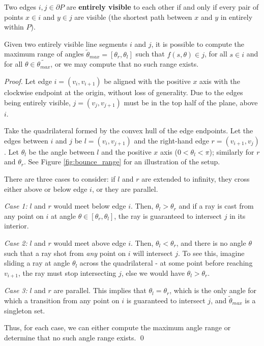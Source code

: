\documentclass[]{styles/svproc}  %
\begin{document}
\begin{definition}
Two edges $i,j \in \partial P$ are \textbf{entirely visible} to each other if
and only if every pair of points $x \in i$ and $y \in j$ are visible (the
shortest path between $x$ and $y$ in entirely within $P$).
\end{definition}

\begin{proposition}
Given two entirely visible line segments $i$ and $j$, it is possible to compute
the maximum range of angles $\tilde{\theta}_{max} = [\theta_r, \theta_l]$ such
that $f(s, \theta) \in j$, for all $s \in i$ and for all
$\theta \in \tilde{\theta_{max}}$, or we may compute that no such range exists.
\end{proposition}

\begin{proof}

Let edge $i = (v_i, v_{i+1})$ be aligned with the positive $x$ axis with the clockwise
endpoint at the origin, without loss of generality. Due to the edges being
entirely visible, $j = (v_j, v_{j+1})$ must be in the top half of the plane, above $i$.

Take the quadrilateral formed by the convex hull of the edge endpoints.
Let the edges between $i$ and $j$ be $l = (v_i, v_{j+1})$ and the right-hand edge 
$r = (v_{i+1}, v_j)$. Let $\theta_{l}$ be
the angle between $l$ and the positive $x$ axis ($0 < \theta_l < \pi$); similarly
for $r$ and $\theta_r$. See Figure \ref{fig:bounce_range} for an illustration of
the setup. 

There are three cases to consider: if $l$ and $r$ are extended to infinity,
they cross either above or below edge $i$, or they are parallel.

\emph{Case 1:} $l$ and $r$ would meet below edge $i$. Then,
$\theta_l > \theta_r$ and if a ray is cast from any point on $i$ at angle
$\theta \in [\theta_r, \theta_l]$, the ray is guaranteed to intersect $j$ in its
interior.

\emph{Case 2:} $l$ and $r$ would meet above edge $i$. Then, $\theta_l <
\theta_r$, and there is no angle
$\theta$ such that a ray shot from \emph{any} point on $i$ will intersect $j$.
To see this, imagine sliding a ray at angle $\theta_l$ across the quadrilateral
- at some point before reaching $v_{i+1}$, the ray must stop intersecting $j$,
else we would have $\theta_l > \theta_r$.

\emph{Case 3:} $l$ and $r$ are parallel. This implies that $\theta_{l} =
\theta_{r}$, which is the only angle for which a transition from any
point on $i$ is guaranteed to intersect $j$, and $\tilde{\theta}_{max}$ is a
singleton set.

Thus, for each case, we can either compute the maximum angle range or determine
that no such angle range exists.
\qed

\end{proof}
\end{document}
